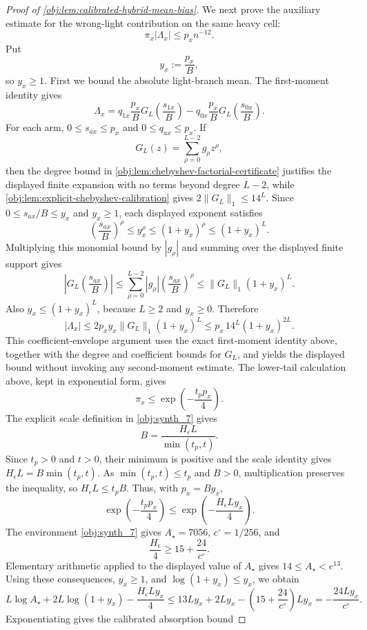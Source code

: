 \begin{proof}[Proof of \cref{obj:lem:calibrated-hybrid-mean-bias}]
We next prove the auxiliary estimate for the wrong-light contribution on the same heavy cell:
\[
\pi_x|\Lambda_x|\le p_x n^{-12}.
\]
Put
\[
y_x:=\frac{p_x}{B},
\]
so \(y_x\ge1\).  First we bound the absolute light-branch mean.  The first-moment identity gives
\[
\Lambda_x
=
q_{1x}\frac{p_x}{B}G_L\!\left(\frac{s_{1x}}B\right)
-
q_{0x}\frac{p_x}{B}G_L\!\left(\frac{s_{0x}}B\right).
\]
For each arm, \(0\le s_{ax}\le p_x\) and \(0\le q_{ax}\le p_x\).  If
\[
G_L(z)=\sum_{\rho=0}^{L-2} g_\rho z^\rho,
\]
then the degree bound in \cref{obj:lem:chebyshev-factorial-certificate} justifies the displayed finite expansion with no terms beyond degree \(L-2\), while \cref{obj:lem:explicit-chebyshev-calibration} gives
\(2\|G_L\|_1\le14^L\).  Since \(0\le s_{ax}/B\le y_x\) and \(y_x\ge1\), each displayed exponent satisfies
\[
\left(\frac{s_{ax}}B\right)^\rho\le y_x^\rho\le(1+y_x)^\rho\le(1+y_x)^L.
\]
Multiplying this monomial bound by \(|g_\rho|\) and summing over the displayed finite support gives
\[
\left|G_L\!\left(\frac{s_{ax}}B\right)\right|
\le \sum_{\rho=0}^{L-2}|g_\rho|\left(\frac{s_{ax}}B\right)^\rho
\le \|G_L\|_1(1+y_x)^L.
\]
Also \(y_x\le(1+y_x)^L\), because \(L\ge2\) and \(y_x\ge0\).  Therefore
\[
|\Lambda_x|
\le
2p_xy_x\|G_L\|_1(1+y_x)^L
\le
p_x\,14^L(1+y_x)^{2L}.
\]
This coefficient-envelope argument uses the exact first-moment identity above, together with the degree and coefficient bounds for \(G_L\), and yields the displayed bound without invoking any second-moment estimate.
The lower-tail calculation above, kept in exponential form, gives
\[
\pi_x\le\exp\!\left(-\frac{t_pp_x}{4}\right).
\]
The explicit scale definition in \cref{obj:synth_7} gives
\[
B=\frac{H_\epsilon L}{\min(t_p,t)}.
\]
Since \(t_p>0\) and \(t>0\), their minimum is positive and the scale identity
gives \(H_\epsilon L=B\min(t_p,t)\).  As \(\min(t_p,t)\le t_p\) and
\(B>0\), multiplication preserves the inequality, so \(H_\epsilon L\le
t_pB\).  Thus, with \(p_x=By_x\),
\[
\exp\!\left(-\frac{t_pp_x}{4}\right)
\le
\exp\!\left(-\frac{H_\epsilon Ly_x}{4}\right).
\]
The environment \cref{obj:synth_7} gives \(A_\star=7056\),
\(c^\circ=1/256\), and
\[
\frac{H_\epsilon}{4}\ge 15+\frac{24}{c^\circ}.
\]
Elementary arithmetic applied to the displayed value of \(A_\star\) gives
\(14\le A_\star<e^{13}\).  Using these consequences, \(y_x\ge1\), and
\(\log(1+y_x)\le y_x\), we obtain
\[
L\log A_\star+2L\log(1+y_x)-\frac{H_\epsilon Ly_x}{4}
\le
13Ly_x+2Ly_x-\left(15+\frac{24}{c^\circ}\right)Ly_x
=
-\frac{24Ly_x}{c^\circ}.
\]
Exponentiating gives the calibrated absorption bound

\end{proof}
